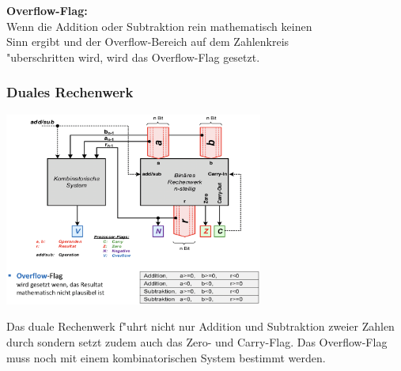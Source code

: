 \begin{minipage}[t]{10cm}
\begin{tabbing}
		\textbf{Overflow-Flag:}\\
		\> Wenn die Addition oder Subtraktion rein mathematisch keinen\\ 
		\> Sinn ergibt und der Overflow-Bereich auf dem Zahlenkreis\\
		\> "uberschritten wird, wird das Overflow-Flag gesetzt.
	\end{tabbing}

	\subsubsection{Duales Rechenwerk}
	\includegraphics[width=8.5cm]{pics/Duales_rechenwerk}
	
	Das duale Rechenwerk f"uhrt nicht nur Addition und Subtraktion zweier Zahlen durch sondern setzt zudem auch das Zero- und Carry-Flag. Das Overflow-Flag muss noch mit einem kombinatorischen System bestimmt werden.
\end{minipage}
%
\begin{minipage}{0.5cm}
	\ \
\end{minipage}
%
